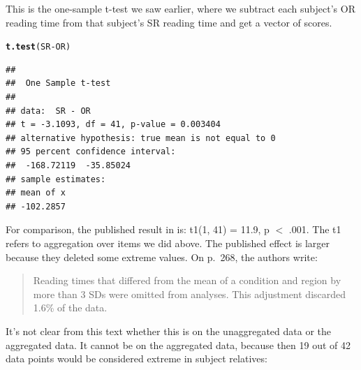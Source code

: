 \documentclass[12pt]{book}\usepackage[]{graphicx}\usepackage[]{color}
\makeatletter
\newcommand{\hlopt}[1]{\textcolor[rgb]{0,0,0}{#1}}%
\newcommand{\hlstd}[1]{\textcolor[rgb]{0.345,0.345,0.345}{#1}}%
\newcommand{\hlkwd}[1]{\textcolor[rgb]{0.737,0.353,0.396}{\textbf{#1}}}%
\newenvironment{kframe}{%
 \def\at@end@of@kframe{}%
 \ifinner\ifhmode%
  \def\at@end@of@kframe{\end{minipage}}%
  \begin{minipage}{\columnwidth}%
 \fi\fi%
 \def\FrameCommand##1{\hskip\@totalleftmargin \hskip-\fboxsep
 \colorbox{shadecolor}{##1}\hskip-\fboxsep
     \hskip-\linewidth \hskip-\@totalleftmargin \hskip\columnwidth}%
 \MakeFramed {\advance\hsize-\width
   \@totalleftmargin\z@ \linewidth\hsize
   \@setminipage}}%
 {\par\unskip\endMakeFramed%
 \at@end@of@kframe}
\newenvironment{knitrout}{}{} %
\makeatother
\begin{document}
This is the one-sample t-test we saw earlier, where we subtract each subject's OR reading time from that subject's SR reading time and get a vector of scores.

\begin{knitrout}
\color{fgcolor}\begin{kframe}
\begin{alltt}
\hlkwd{t.test}\hlstd{(SR}\hlopt{-}\hlstd{OR)}
\end{alltt}
\begin{verbatim}
## 
## 	One Sample t-test
## 
## data:  SR - OR
## t = -3.1093, df = 41, p-value = 0.003404
## alternative hypothesis: true mean is not equal to 0
## 95 percent confidence interval:
##  -168.72119  -35.85024
## sample estimates:
## mean of x 
## -102.2857
\end{verbatim}
\end{kframe}
\end{knitrout}

For comparison, the published result in \cite{grodner} is:  t1(1, 41) = 11.9, p $<$ .001. The t1 refers to aggregation over items we did above. The published effect is larger because they deleted some extreme values. On p.\ 268, the authors write:


\begin{quote}
Reading times that differed from the mean of a condition and region by more than 3 SDs were omitted from analyses. This adjustment discarded 1.6\% of the data. 
\end{quote}

It's not clear from this text whether this is on the unaggregated data or the aggregated data. It cannot be on the aggregated data, because then 19 out of 42 data points would be considered extreme in subject relatives:
\end{document}
